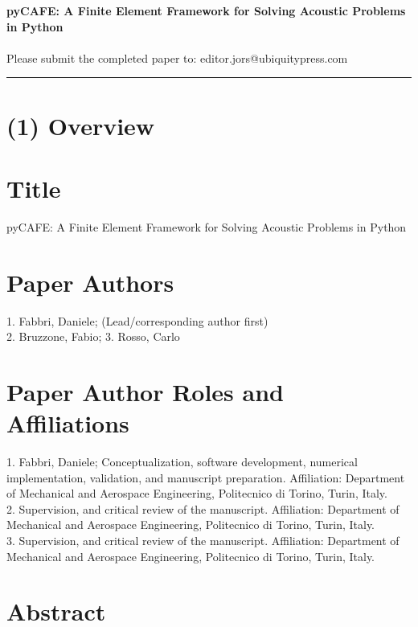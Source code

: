 \documentclass{jors}
\begin{document}
{\bf {pyCAFE: A Finite Element Framework for Solving Acoustic Problems in Python}} \\ \\

Please submit the completed paper to: editor.jors@ubiquitypress.com

\rule{\textwidth}{1pt}

\section*{(1) Overview}

\vspace{0.5cm}

\section*{Title}

pyCAFE: A Finite Element Framework for Solving Acoustic Problems in Python

\section*{Paper Authors}

1. Fabbri, Daniele; (Lead/corresponding author first) \\
2. Bruzzone, Fabio; 3. Rosso, Carlo

\section*{Paper Author Roles and Affiliations}
1. Fabbri, Daniele; Conceptualization, software development, numerical implementation, validation, and manuscript preparation. Affiliation: Department of Mechanical and Aerospace Engineering, Politecnico di Torino, Turin, Italy.\\
2. Supervision, and critical review of the manuscript. Affiliation: Department of Mechanical and Aerospace Engineering, Politecnico di Torino, Turin, Italy.\\
3. Supervision, and critical review of the manuscript. Affiliation: Department of Mechanical and Aerospace Engineering, Politecnico di Torino, Turin, Italy.

\section*{Abstract}
\end{document}
